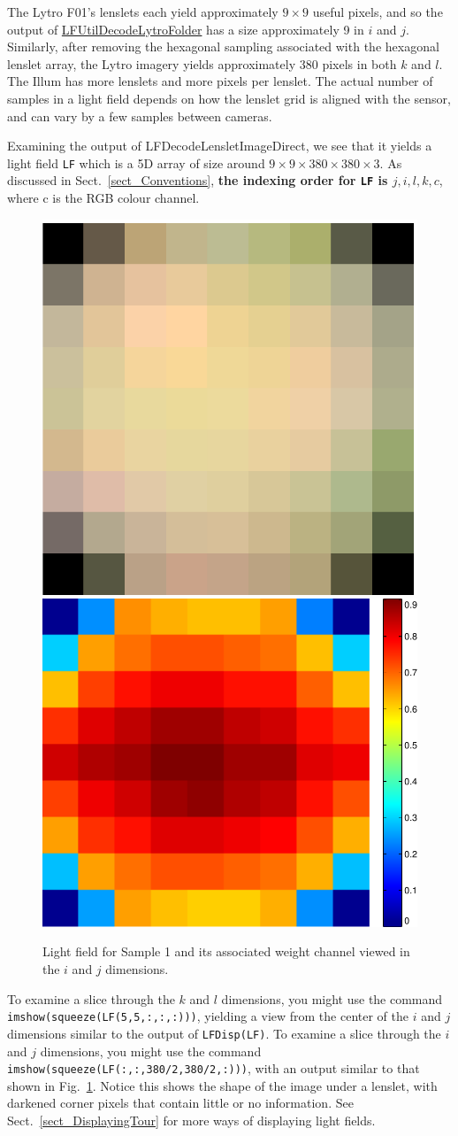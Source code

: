 \documentclass[onecolumn]{article}
\newcommand{\CiteFunc}[1]{\hyperlink{#1}{\small #1}}
\newcommand{\SupFunction}[1]{{\small #1}}
\newcommand{\SymbolText}[1]{\texttt{\small #1}}
\begin{document}
The Lytro F01's lenslets each yield approximately $9 \times 9$ useful pixels, and so the output of \CiteFunc{LFUtilDecodeLytroFolder} has a size approximately 9 in $i$ and $j$. Similarly, after removing the hexagonal sampling associated with the hexagonal lenslet array, the Lytro imagery yields approximately $380$ pixels in both $k$ and $l$.  The Illum has more lenslets and more pixels per lenslet. The actual number of samples in a light field depends on how the lenslet grid is aligned with the sensor, and can vary by a few samples between cameras.

Examining the output of \SupFunction{LFDecodeLensletImageDirect}, we see that it yields a light field \SymbolText{LF} which is a 5D array of size around $9\times9\times380\times380\times3$. As discussed in Sect.~\ref{sect_Conventions}, \textbf{the indexing order for \SymbolText{LF} is $j, i, l, k, c$}, where c is the RGB colour channel. 

\begin{figure}[tbh]
	\centering
	\includegraphics[height=0.45\textwidth]{Figs/STSlice}
	\includegraphics[height=0.45\textwidth]{Figs/WeightSTSlice}
	\caption{Light field for Sample 1 and its associated weight channel viewed in the $i$ and $j$ dimensions.}
	\label{fig_STSlice}
\end{figure}

To examine a slice through the $k$ and $l$ dimensions, you might use the command \SymbolText{imshow(squeeze(LF(5,5,:,:,:)))}, yielding a view from the center of the $i$ and $j$ dimensions similar to the output of \SymbolText{LFDisp(LF)}. To examine a slice through the $i$ and $j$ dimensions, you might use the command \SymbolText{imshow(squeeze(LF(:,:,380/2,380/2,:)))}, with an output similar to that shown in Fig.~\ref{fig_STSlice}. Notice this shows the shape of the image under a lenslet, with darkened corner pixels that contain little or no information. See Sect.~\ref{sect_DisplayingTour} for more ways of displaying light fields.
\end{document}
